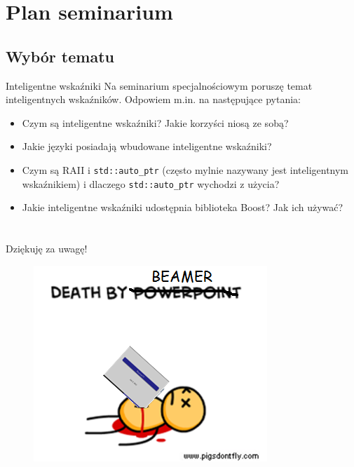 \section{Plan seminarium}
\subsection{Wybór tematu}
\begin{frame}{Inteligentne wskaźniki}
	Na seminarium specjalnościowym poruszę temat inteligentnych wskaźników.
	Odpowiem m.in. na następujące pytania: \pause
	\begin{itemize}
		\item Czym są inteligentne wskaźniki? Jakie korzyści niosą ze sobą? \pause
		\item Jakie języki posiadają wbudowane inteligentne wskaźniki?       \pause
		\item Czym są RAII i \texttt{std::auto\_ptr} (często mylnie nazywany jest
		  inteligentnym wskaźnikiem) i dlaczego \texttt{std::auto\_ptr}
		  wychodzi z użycia?              \pause
		\item Jakie inteligentne wskaźniki udostępnia biblioteka Boost?  \pause
		  Jak ich używać?
	\end{itemize}
\end{frame}



\section{}
\begin{frame}
  \begin{center}
    \huge
    Dziękuję za uwagę!
  \end{center}
  \bigskip
  
      \begin{figure}
      \includegraphics[scale=0.5]{img/death-by-beamer}
    \end{figure}
 

\end{frame}


